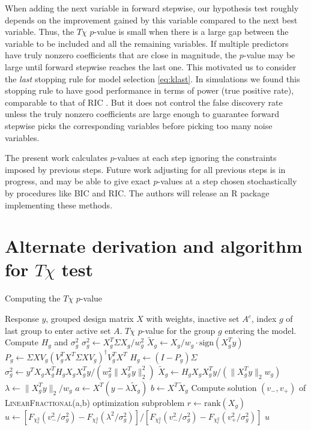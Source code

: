 \documentclass{imsart}
\newcommand{\norm}[1]{\lVert #1 \rVert}
\begin{document}
When adding the next variable in forward stepwise, our hypothesis test
roughly depends on the improvement gained by this variable compared to
the next best variable. Thus, the $T\chi$ $p$-value is small when there is a large
gap between the variable to be included and all the remaining variables.
If multiple predictors have truly nonzero coefficients that are close
in magnitude, the $p$-value may be large until forward stepwise reaches
the last one. This motivated us to consider the \textit{last} stopping
rule for model selection \eqref{eq:klast}. In simulations we
found this stopping rule to have good performance in terms of power
(true positive rate), comparable to that of RIC \citep{RIC}.
But it does not control the false discovery rate
unless the truly nonzero coefficients are large enough to guarantee
forward stepwise picks the corresponding variables before picking too
many noise variables.

The present work calculates $p$-values at each step ignoring the constraints
imposed by previous steps. Future work adjusting for all previous steps
is in progress, and may be able to give exact $p$-values at a step chosen
stochastically by procedures like BIC and RIC. The authors will
release an R package implementing these methods.



%


\appendix
\section{Alternate derivation and algorithm for $T\chi$ test}
\label{app:algo}

\begin{algorithm}
 \caption{Computing the $T\chi$ $p$-value}
 \label{algo:pval}
 \begin{algorithmic}
   \REQUIRE Response $y$, grouped design matrix $X$ with weights, inactive set $A^c$, index $g$ of last group to enter active set $A$.
   \ENSURE $T\chi$ $p$-value for the group $g$ entering the model.
   \STATE Compute $H_g$ and $\sigma^2_g$
   \STATE $\sigma_g^2 \gets X_g^T\Sigma X_g/w_g^2$
   \STATE $\tilde X_g \gets X_g / w_g \cdot \text{sign}(X_g^Ty)$
   \ELSE
   \STATE $P_g \gets \Sigma XV_g (V_g^T X^T \Sigma X V_g)^\dagger V_g^TX^T$
   \STATE $H_g \gets (I - P_g)\Sigma$
   \STATE $\sigma^2_g \gets y^TX_gX_g^T H_g X_gX_g^Ty / (w_g^2 \norm{X_g^Ty}_2^2)$
   \STATE $\tilde X_g \gets H_g X_g X_g^T y /(\norm{X_g^Ty}_2 w_g)$
   \ENDIF
   \STATE $\lambda \gets \norm{X_g^Ty}_2/w_g$
   \STATE {}
   \STATE $a \gets X^T(y - \lambda \tilde X_g)$
   \STATE $b \gets X^T \tilde X_g$
   \STATE Compute solution $(v_-, v_+)$ of \textsc{LinearFractional}(a,b) optimization subproblem
   \STATE $r \gets \text{rank}(X_g)$
   \STATE $u \gets [F_{\chi^2_r}(v^2_-/\sigma_g^2) - F_{\chi^2_r}(\lambda^2/\sigma_g^2)]/[F_{\chi^2_r}(v^2_-/\sigma_g^2) - F_{\chi^2_r}(v^2_+/\sigma_g^2)]$
   \RETURN $u$
 \end{algorithmic}
\end{algorithm}
\end{document}
